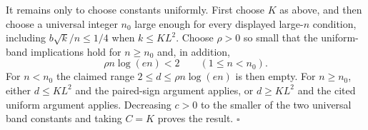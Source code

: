 It remains only to choose constants uniformly.  First choose \(K\) as above, and then choose a universal integer \(n_0\) large enough for every displayed large-\(n\) condition, including \(b\sqrt{k}/n\le1/4\) when \(k\le K L^2\).  Choose \(\rho>0\) so small that the uniform-band implications hold for \(n\ge n_0\) and, in addition,
\[
 \rho n\log(en)<2\qquad(1\le n<n_0).
\]
For \(n<n_0\) the claimed range \(2\le d\le\rho n\log(en)\) is then empty.  For \(n\ge n_0\), either \(d\le K L^2\) and the paired-sign argument applies, or \(d\ge K L^2\) and the cited uniform argument applies.  Decreasing \(c>0\) to the smaller of the two universal band constants and taking \(C=K\) proves the result. \(\square\)